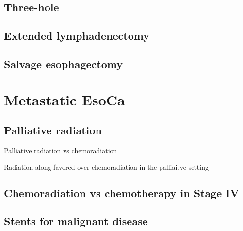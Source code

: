 \documentclass[
]{book}
\begin{document}
\hypertarget{three-hole}{%
\section{Three-hole}\label{three-hole}}

\hypertarget{extended-lymphadenectomy}{%
\section{Extended lymphadenectomy}\label{extended-lymphadenectomy}}

\hypertarget{salvage-esophagectomy}{%
\section{Salvage esophagectomy}\label{salvage-esophagectomy}}

\citep{markar922}

\citep{swisher175}

\hypertarget{eso_metastatic}{%
\chapter{Metastatic EsoCa}\label{eso_metastatic}}

\hypertarget{palliative-radiation}{%
\section{Palliative radiation}\label{palliative-radiation}}

Palliative radiation vs chemoradiation \citep{penniment114}

Radiation along favored over chemoradiation in the palliaitve setting \citep{penniment114}

\hypertarget{chemoradiation-vs-chemotherapy-in-stage-iv}{%
\section{Chemoradiation vs chemotherapy in Stage IV}\label{chemoradiation-vs-chemotherapy-in-stage-iv}}

\citep{guttmann1131}

\hypertarget{stents-for-malignant-disease}{%
\section{Stents for malignant disease}\label{stents-for-malignant-disease}}

\citep{vakil1791}
\end{document}
